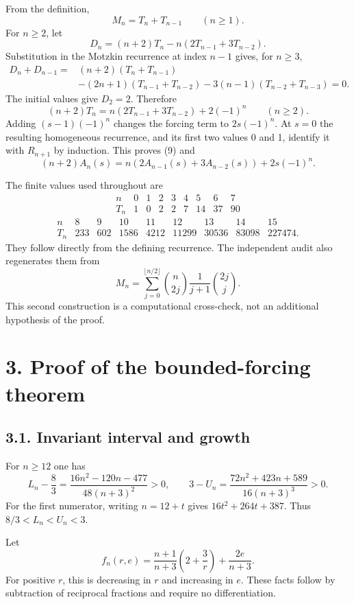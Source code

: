 \documentclass[
  11pt,
  a4paper,
]{article}
\begin{document}
From the definition, \[
M_n=T_n+T_{n-1}\qquad(n\ge1).
\] For \(n\ge2\), let \[
D_n=(n+2)T_n-n(2T_{n-1}+3T_{n-2}).
\] Substitution in the Motzkin recurrence at index \(n-1\) gives, for
\(n\ge3\), \[
\begin{aligned}
D_n+D_{n-1}
={}&(n+2)(T_n+T_{n-1})\\
&-(2n+1)(T_{n-1}+T_{n-2})
-3(n-1)(T_{n-2}+T_{n-3})=0.
\end{aligned}
\] The initial values give \(D_2=2\). Therefore \[
(n+2)T_n=n(2T_{n-1}+3T_{n-2})+2(-1)^n
\qquad(n\ge2).
\tag{10}
\] Adding \((s-1)(-1)^n\) changes the forcing term to \(2s(-1)^n\). At
\(s=0\) the resulting homogeneous recurrence, and its first two values 0
and 1, identify it with \(R_{n+1}\) by induction. This proves (9) and \[
(n+2)A_n(s)=n(2A_{n-1}(s)+3A_{n-2}(s))+2s(-1)^n.
\tag{11}
\]

The finite values used throughout are \[
\begin{array}{c|rrrrrrrr}
n&0&1&2&3&4&5&6&7\\\hline
T_n&1&0&2&2&7&14&37&90
\end{array}
\] \[
\begin{array}{c|rrrrrrrr}
n&8&9&10&11&12&13&14&15\\\hline
T_n&233&602&1586&4212&11299&30536&83098&227474.
\end{array}
\] They follow directly from the defining recurrence. The independent
audit also regenerates them from \[
M_n=\sum_{j=0}^{\lfloor n/2\rfloor}\binom n{2j}\frac1{j+1}\binom{2j}j.
\] This second construction is a computational cross-check, not an
additional hypothesis of the proof.

\section{3. Proof of the bounded-forcing
theorem}\label{proof-of-the-bounded-forcing-theorem}

\subsection{3.1. Invariant interval and
growth}\label{invariant-interval-and-growth}

For \(n\ge12\) one has \[
L_n-\frac83=\frac{16n^2-120n-477}{48(n+3)^2}>0,
\qquad
3-U_n=\frac{72n^2+423n+589}{16(n+3)^3}>0.
\tag{12}
\] For the first numerator, writing \(n=12+t\) gives \(16t^2+264t+387\).
Thus \(8/3<L_n<U_n<3\).

Let \[
f_n(r,e)=\frac{n+1}{n+3}\left(2+\frac3r\right)+\frac{2e}{n+3}.
\] For positive \(r\), this is decreasing in \(r\) and increasing in
\(e\). These facts follow by subtraction of reciprocal fractions and
require no differentiation.
\end{document}
